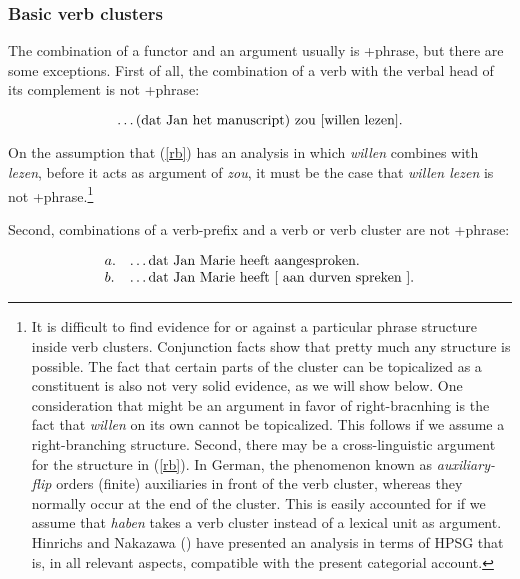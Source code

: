 \subsubsection{Basic verb clusters}

The combination of a functor and an argument usually is {\sc +phrase}, but
there are some exceptions.  First of all, the combination of a verb with the
verbal head of its complement is not {\sc +phrase}:

\begin{equation}
\label{rb}
\ldots\mbox{(dat Jan het manuscript) zou [willen lezen]}. \\
\end{equation}

\noindent On the assumption that (\ref{rb}) has an analysis in which {\em
willen} combines with {\em lezen}, before it acts as argument of {\em zou}, it
must be the case that {\em willen lezen} is not {\sc +phrase}.\footnote{
\label{against-lb} It is difficult to find evidence for or against a particular
phrase structure inside verb clusters.  Conjunction facts show that pretty much
any structure is possible.  The fact that certain parts of the cluster can be
topicalized as a constituent is also not very solid evidence, as we will show
below.  One consideration that might be an argument in favor of 
right-bracnhing  is the fact that {\em willen} on its own cannot be 
topicalized. This follows if
we assume a right-branching structure.  Second, there may be a cross-linguistic
argument for the structure in (\ref{rb}).  In German, the phenomenon known as
{\em auxiliary-flip} orders (finite) auxiliaries in front of the verb cluster,
whereas they normally occur at the end of the cluster.  This is easily accounted
for if we assume that {\em haben} takes a verb cluster instead of a lexical unit
as argument.  Hinrichs and Nakazawa (\citeyear{HinrichsNakazawa93}) have
presented an analysis in terms of HPSG that is, in all relevant aspects,
compatible with the present categorial account.}

Second, combinations of a verb-prefix and a verb or verb cluster are not {\sc 
+phrase}:

\begin{equation}
\label{sep-prefix}
\begin{array}[t]{ll@{\hspace{0cm}}l}
a. && \ldots\mbox{dat Jan Marie heeft aangesproken}. \\
b. && \ldots\mbox{dat Jan Marie heeft [ aan durven spreken ]}. \\
\end{array}
\end{equation}

